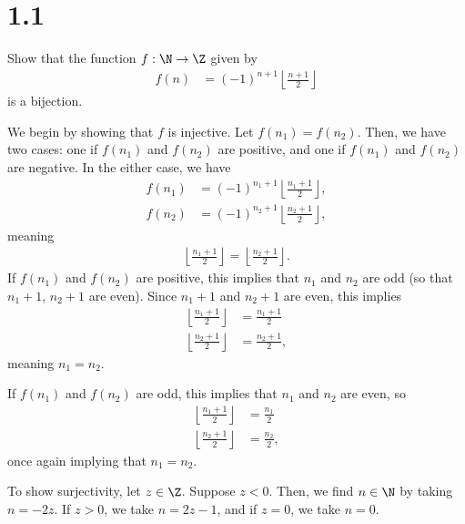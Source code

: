 \documentclass[10pt]{mypackage}
\begin{document}
\section{1.1}%
\begin{problem}
  Show that the function $f: \N\rightarrow \Z$ given by
  \begin{align*}
    f(n) &= \left(-1\right)^{n+1}\left\lfloor \frac{n+1}{2}\right\rfloor
  \end{align*}
  is a bijection.
\end{problem}
\begin{solution}
  We begin by showing that $f$ is injective. Let $f\left(n_1\right) = f\left(n_2\right)$. Then, we have two cases: one if $f\left(n_1\right)$ and $f\left(n_2\right)$ are positive, and one if $f\left(n_1\right)$ and $f\left(n_2\right)$ are negative. In the either case, we have
  \begin{align*}
    f\left(n_1\right) &= \left(-1\right)^{n_1 + 1}\left\lfloor \frac{n_1 + 1}{2}\right\rfloor,\\
    f\left(n_2\right) &= \left(-1\right)^{n_2 + 1}\left\lfloor \frac{n_2 + 1}{2}\right\rfloor,
  \end{align*}
  meaning 
  \begin{align*}
    \left\lfloor \frac{n_1 + 1}{2}\right\rfloor = \left\lfloor \frac{n_2 + 1}{2}\right\rfloor.
  \end{align*}
  If $f\left(n_1\right)$ and $f\left(n_2\right)$ are positive, this implies that $n_1$ and $n_2$ are odd (so that $n_1 + 1$, $ n_2+ 1$ are even). Since $n_1 + 1$ and $n_2 + 1$ are even, this implies
  \begin{align*}
    \left\lfloor\frac{n_1 + 1}{2}\right\rfloor &= \frac{n_1 + 1}{2}\\
    \left\lfloor \frac{n_2 + 1}{2}\right\rfloor &= \frac{n_2 + 1}{2},
  \end{align*}
  meaning $n_1 = n_2$.\newline

  If $f\left(n_1\right)$ and $f\left(n_2\right)$ are odd, this implies that $n_1$ and $n_2$ are even, so
  \begin{align*}
    \left\lfloor\frac{n_1 + 1}{2}\right\rfloor &= \frac{n_1 }{2}\\
    \left\lfloor \frac{n_2 + 1}{2}\right\rfloor &= \frac{n_2 }{2},
  \end{align*}
  once again implying that $n_1 = n_2$.\newline

  To show surjectivity, let $z\in \Z$. Suppose $z < 0$. Then, we find $n\in \N$ by taking $n = -2z$. If $z > 0$, we take $n = 2z - 1$, and if $z = 0$, we take $n = 0$.
\end{solution}
\end{document}
